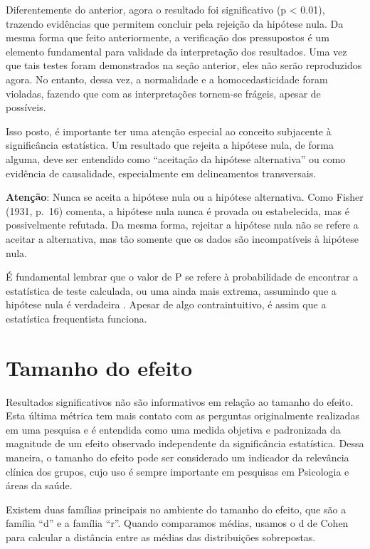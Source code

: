 \documentclass[
]{book}
\begin{document}
Diferentemente do anterior, agora o resultado foi significativo (p \textless{} 0.01), trazendo evidências que permitem concluir pela rejeição da hipótese nula. Da mesma forma que feito anteriormente, a verificação dos pressupostos é um elemento fundamental para validade da interpretação dos resultados. Uma vez que tais testes foram demonstrados na seção anterior, eles não serão reproduzidos agora. No entanto, dessa vez, a normalidade e a homocedasticidade foram violadas, fazendo que com as interpretações tornem-se frágeis, apesar de possíveis.

Isso posto, é importante ter uma atenção especial ao conceito subjacente à significância estatística. Um resultado que rejeita a hipótese nula, de forma alguma, deve ser entendido como ``aceitação da hipótese alternativa'' ou como evidência de causalidade, especialmente em delineamentos transversais.

\textbf{Atenção}: Nunca se aceita a hipótese nula ou a hipótese alternativa. Como Fisher (1931, p.~16) comenta, a hipótese nula nunca é provada ou estabelecida, mas é possivelmente refutada. Da mesma forma, rejeitar a hipótese nula não se refere a aceitar a alternativa, mas tão somente que os dados são incompatíveis à hipótese nula.

É fundamental lembrar que o valor de P se refere à probabilidade de encontrar a estatística de teste calculada, ou uma ainda mais extrema, assumindo que a hipótese nula é verdadeira \citep{Wasserstein2016}. Apesar de algo contraintuitivo, é assim que a estatística frequentista funciona.

\hypertarget{tamanho-do-efeito-1}{%
\section{Tamanho do efeito}\label{tamanho-do-efeito-1}}

Resultados significativos não são informativos em relação ao tamanho do efeito. Esta última métrica tem mais contato com as perguntas originalmente realizadas em uma pesquisa e é entendida como uma medida objetiva e padronizada da magnitude de um efeito observado independente da significância estatística. Dessa maneira, o tamanho do efeito pode ser considerado um indicador da relevância clínica dos grupos, cujo uso é sempre importante em pesquisas em Psicologia e áreas da saúde.

Existem duas famílias principais no ambiente do tamanho do efeito, que são a família ``d'' e a família ``r''. Quando comparamos médias, usamos o d de Cohen para calcular a distância entre as médias das distribuições sobrepostas.
\end{document}
